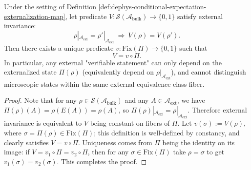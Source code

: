 \begin{proposition}\label{prop:dephys-horizon-sufficiency-zero-knowledge}
Under the setting of Definition \ref{def:dephys-conditional-expectation-externalization-map},
let predicate \(V:\mathcal{S}(\mathcal{A}_{\mathrm{bulk}})\to\{0,1\}\) satisfy external invariance:
\[
\rho|_{\mathcal{A}_{\mathrm{ext}}}=\rho'|_{\mathcal{A}_{\mathrm{ext}}}
\ \Longrightarrow\
V(\rho)=V(\rho').
\]
Then there exists a unique predicate \(v:\mathrm{Fix}(\Pi)\to\{0,1\}\) such that
\begin{equation}\label{eq:dephys-zero-knowledge-factorization-by-Pi}
\boxed{\;
V=v\circ\Pi.\;}
\end{equation}
In particular, any external "verifiable statement" can only depend on the externalized state \(\Pi(\rho)\) (equivalently depend on \(\rho|_{\mathcal{A}_{\mathrm{ext}}}\)), and cannot distinguish microscopic states within the same external equivalence class fiber.
\end{proposition}

\begin{proof}
Note that for any \(\rho\in\mathcal{S}(\mathcal{A}_{\mathrm{bulk}})\) and any \(A\in\mathcal{A}_{\mathrm{ext}}\), we have
\(
\Pi(\rho)(A)=\rho(E(A))=\rho(A)
\), so \(\Pi(\rho)|_{\mathcal{A}_{\mathrm{ext}}}=\rho|_{\mathcal{A}_{\mathrm{ext}}}\).
Therefore external invariance is equivalent to \(V\) being constant on fibers of \(\Pi\).
Let \(v(\sigma):=V(\rho)\), where \(\sigma=\Pi(\rho)\in\mathrm{Fix}(\Pi)\);
this definition is well-defined by constancy, and clearly satisfies \(V=v\circ\Pi\).
Uniqueness comes from \(\Pi\) being the identity on its image: if \(V=v_1\circ\Pi=v_2\circ\Pi\), then for any \(\sigma\in\mathrm{Fix}(\Pi)\) take \(\rho=\sigma\) to get \(v_1(\sigma)=v_2(\sigma)\). This completes the proof.
\end{proof}

